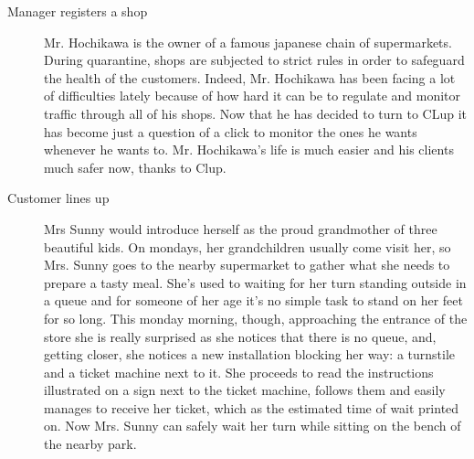 \begin{description}
    \item[Manager registers a shop]
    Mr. Hochikawa is the owner of a famous japanese chain of supermarkets.
    During quarantine, shops are subjected to strict rules in order to safeguard the health of the customers. Indeed, Mr. Hochikawa has been facing a lot of difficulties lately because of how hard it can be to regulate and monitor traffic through all of his shops. Now that he has decided to turn to CLup it has become just a question of a click to monitor the ones he wants whenever he wants to. Mr. Hochikawa’s life is much easier and his clients much safer now, thanks to Clup.

    \item[Customer lines up]
    Mrs Sunny would introduce herself as the proud grandmother of three beautiful kids.   
    On mondays, her grandchildren usually come visit her, so  Mrs. Sunny goes to the nearby supermarket to gather what she needs to prepare a tasty meal. She's used to waiting for her turn standing outside in a queue and for someone of her age it's no simple task to stand on her feet for so long. This monday morning, though, approaching the entrance of the store she is really surprised as she notices that there is no queue, and, getting closer, she notices a new installation blocking her way: a turnstile and a ticket machine next to it. She proceeds to read the instructions illustrated on a sign next to the ticket machine, follows them and easily manages to receive her ticket, which as the estimated time of wait printed on. Now Mrs. Sunny can safely wait her turn while sitting on the bench of the nearby park. 


\end{description}
